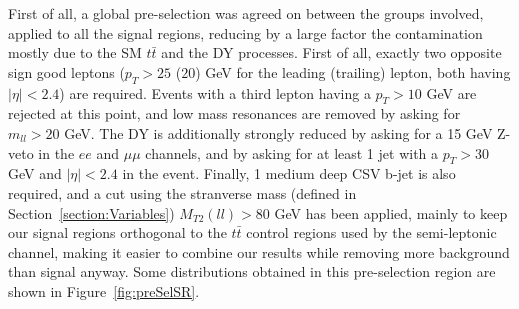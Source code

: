 \documentclass[a4paper, 10pt, openright]{report}
\begin{document}
First of all, a global pre-selection was agreed on between the groups involved, applied to all the signal regions, reducing by a large factor the contamination mostly due to the \ac{SM} $t \bar t$ and the \ac{DY} processes. First of all, exactly two opposite sign good leptons ($p_T > 25$ ($20$) GeV for the leading (trailing) lepton, both having $|\eta| < 2.4$) are required. Events with a third lepton having a $p_T > 10$ GeV are rejected at this point, and low mass resonances are removed by asking for $m_{ll} > 20$ GeV. The \ac{DY} is additionally strongly reduced by asking for a 15 GeV Z-veto in the $ee$ and $\mu \mu$ channels, and by asking for at least 1 jet with a $p_T > 30$ GeV and $|\eta| < 2.4$ in the event. Finally, 1 medium deep CSV b-jet is also required, and a cut using the stranverse mass (defined in Section~\ref{section:Variables}) $M_{T2}(ll) > 80$ GeV has been applied, mainly to keep our signal regions orthogonal to the $t \bar t$ control regions used by the semi-leptonic channel, making it easier to combine our results while removing more background than signal anyway. Some distributions obtained in this pre-selection region are shown in Figure~\ref{fig:preSelSR}.
\end{document}
